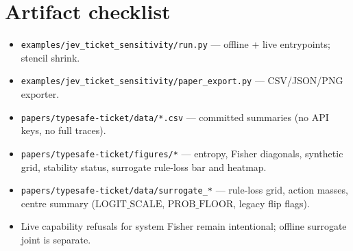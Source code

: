 \documentclass[11pt,a4paper]{article}
\begin{document}
\section{Artifact checklist}
\label{app:artifacts}

\begin{itemize}
  \item \texttt{examples/jev\_ticket\_sensitivity/run.py} --- offline + live entrypoints; stencil shrink.
  \item \texttt{examples/jev\_ticket\_sensitivity/paper\_export.py} --- CSV/JSON/PNG exporter.
  \item \texttt{papers/typesafe-ticket/data/*.csv} --- committed summaries (no API keys, no full traces).
  \item \texttt{papers/typesafe-ticket/figures/*} --- entropy, Fisher diagonals, synthetic grid, stability status,
  surrogate rule-loss bar and heatmap.
  \item \texttt{papers/typesafe-ticket/data/surrogate\_*} --- rule-loss grid, action masses, centre summary
  ($\mathrm{LOGIT\_SCALE}$, $\mathrm{PROB\_FLOOR}$, legacy flip flags).
  \item Live capability refusals for system Fisher remain intentional; offline surrogate joint is separate.
\end{itemize}




\end{document}

